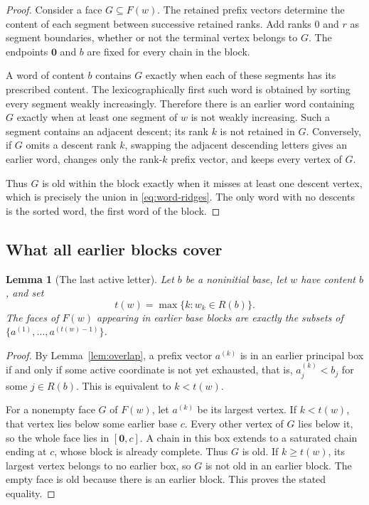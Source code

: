 \documentclass[11pt]{article}
\numberwithin{equation}{section}
\newtheorem{lemma}[theorem]{Lemma}
\theoremstyle{definition}
\theoremstyle{remark}
\newcommand{\zero}{\mathbf 0}
\begin{document}
\begin{proof}
Consider a face $G\subseteq F(w)$. The retained prefix vectors determine the
content of each segment between successive retained ranks. Add ranks $0$ and
$r$ as segment boundaries, whether or not the terminal vertex belongs to $G$.
The endpoints $\zero$ and $b$ are fixed for every chain in the block.

A word of content $b$ contains $G$ exactly when each of these segments has its
prescribed content. The lexicographically first such word is obtained by
sorting every segment weakly increasingly. Therefore there is an earlier word
containing $G$ exactly when at least one segment of $w$ is not weakly
increasing. Such a segment contains an adjacent descent; its rank $k$ is not
retained in $G$. Conversely, if $G$ omits a descent rank $k$, swapping the
adjacent descending letters gives an earlier word, changes only the rank-$k$
prefix vector, and keeps every vertex of $G$.

Thus $G$ is old within the block exactly when it misses at least one descent
vertex, which is precisely the union in \eqref{eq:word-ridges}. The only
word with no descents is the sorted word, the first word of the block.
\end{proof}

\subsection{What all earlier blocks cover}

\begin{lemma}[The last active letter]
\label{lem:last-active}
Let $b$ be a noninitial base, let $w$ have content $b$, and set
\begin{equation}
 t(w)=\max\{k:w_k\in R(b)\}.
 \label{eq:last-active}
\end{equation}
The faces of $F(w)$ appearing in earlier base blocks are exactly the subsets
of $\{a^{(1)},\ldots,a^{(t(w)-1)}\}$.
\end{lemma}

\begin{proof}
By Lemma~\ref{lem:overlap}, a prefix vector $a^{(k)}$ is in an earlier
principal box if and only if some active coordinate is not yet exhausted,
that is, $a^{(k)}_j<b_j$ for some $j\in R(b)$. This is equivalent to
$k<t(w)$.

For a nonempty face $G$ of $F(w)$, let $a^{(k)}$ be its largest vertex. If
$k<t(w)$, that vertex lies below some earlier base $c$. Every other vertex
of $G$ lies below it, so the whole face lies in $[\zero,c]$. A chain in this
box extends to a saturated chain ending at $c$, whose block is already
complete. Thus $G$ is old. If $k\ge t(w)$, its largest vertex belongs to no
earlier box, so $G$ is not old in an earlier block. The empty face is old
because there is an earlier block. This proves the stated equality.
\end{proof}
\end{document}

